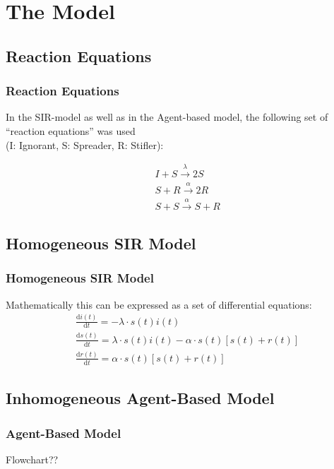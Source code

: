 \documentclass{beamer}
\begin{document}
\section{The Model} %


\subsection{Reaction Equations}

\begin{frame}
\frametitle{Reaction Equations}

In the SIR-model as well as in the Agent-based model, the following set of ``reaction equations'' was used\\(I: Ignorant, S: Spreader, R: Stifler):\\
\vspace{1cm}



\begin{align}
& I + S \xrightarrow{\lambda} 2 S \\
& S + R \xrightarrow{\alpha} 2 R \\
& S + S \xrightarrow{\alpha} S + R 
\end{align}


\end{frame}



\subsection{Homogeneous SIR Model}
\begin{frame}
\frametitle{Homogeneous SIR Model}
Mathematically this can be expressed as a set of differential equations:\\


\begin{align}
& \frac{\text{d}i(t)}{\text{d}t} = -\lambda \cdot s(t)i(t)\\
& \frac{\text{d}s(t)}{\text{d}t} = \lambda \cdot s(t)i(t) - \alpha \cdot s(t)[s(t)+r(t)]\\
&\frac{\text{d}r(t)}{\text{d}t} = \alpha \cdot s(t)[s(t)+r(t)]
\end{align}


\end{frame}


\subsection{Inhomogeneous Agent-Based Model}
\begin{frame}
\frametitle{Agent-Based Model}

Flowchart??

\end{frame}
\end{document}
